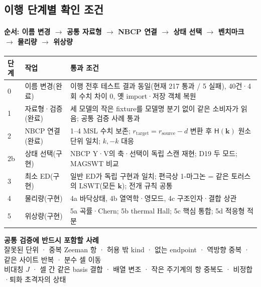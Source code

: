   \par\smallskip
\endgroup


\subsection{이행 단계별 확인 조건}\label{next-steps}
\begingroup%
  \framesubtitle{순서: 이름 변경 $\to$ 공통 자료형 $\to$ NBCP 연결 $\to$ 상태 선택 $\to$ 벤치마크 $\to$ 물리량 $\to$ 위상량}
  \small\renewcommand{\arraystretch}{1.1}
  \begin{tabularx}{\textwidth}{@{}p{0.6cm}p{2.6cm}Y@{}}
    \toprule
    단계 & 작업 & 통과 조건 \\
     & 이름 변경(완료) & 이행 전후 테스트 결과 동일(현재 217 통과 / 5 실패), 40건·4회 수치 차이 0, 옛 import·저장 객체 복원 \\
    1 & 자료형·검증(완료) & 세 모델의 작은 fixture를 모델명 분기 없이 같은 소비자가 읽음; 공통 검증 사례 통과 \\
    2 & NBCP 연결(완료) & 1--4 MSL 수치 보존; $r_{\mathrm{target}}=r_{\mathrm{source}}-d$ 변환 후 $\mathsf H(\mathbf k)$ 원소 단위 일치; $k,-k$ 대응 \\
    2b & 상태 선택(구현) & NBCP Y·V의 축·선택이 독립 스캔 재현; D19 두 모드; MAGSWT 비교 \\
    3 & 최소 ED(구현) & 일반 ED가 독립 구현과 일치; 편극상 1-마그논 = 같은 토러스의 LSWT(모든 $\mathbf k$); 전개 규칙 공통 \\
    4 & 물리량(구현) & 4a 바닥상태, 4b 열역학·영모드, 4c 구조인자·결합 상관 \\
    5 & 위상량(구현) & 5a 곡률·Chern; 5b thermal Hall; 5c 핵심 통합; 5d 적응형 적분 \\
    \bottomrule
  \end{tabularx}
  \par\smallskip
  \textbf{공통 검증에 반드시 포함할 사례}\\[0.3em]
  잘못된 단위 · 중복 Zeeman 항 · 허용 밖 kind · 없는 endpoint · 역방향 중복 · 같은 사이트 반복 · 분수 셀 이동\\
  비대칭 $J$ · 셀 간 같은 basis 결합 · 배열 변조 · 작은 주기계의 항 중복도 · 비정합·퇴화 초격자의 상태
  \par\medskip
\endgroup


